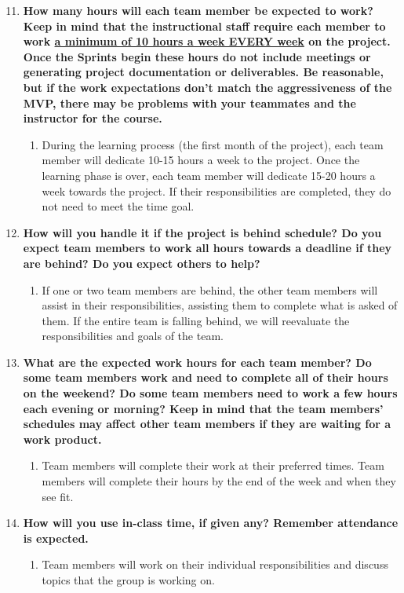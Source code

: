 \documentclass[12pt]{article}
\begin{document}
\begin{enumerate}
    \setcounter{enumi}{10}
    \item \textbf{How many hours will each team member be expected to work? Keep in mind that the instructional staff require each member to work \underline{a minimum of 10 hours a week EVERY week} on the project. Once the Sprints begin these hours do not include meetings or generating project documentation or deliverables. Be reasonable, but if the work expectations don't match the aggressiveness of the MVP, there may be problems with your teammates and the instructor for the course.}
    \begin{enumerate}
        \item During the learning process (the first month of the project), each team member will dedicate 10-15 hours a week to the project. Once the learning phase is over, each team member will dedicate 15-20 hours a week towards the project. If their responsibilities are completed, they do not need to meet the time goal.
    \end{enumerate}

    \item \textbf{How will you handle it if the project is behind schedule? Do you expect team members to work all hours towards a deadline if they are behind? Do you expect others to help?}
    \begin{enumerate}
        \item If one or two team members are behind, the other team members will assist in their responsibilities, assisting them to complete what is asked of them. If the entire team is falling behind, we will reevaluate the responsibilities and goals of the team.
    \end{enumerate}

    \item \textbf{What are the expected work hours for each team member? Do some team members work and need to complete all of their hours on the weekend? Do some team members need to work a few hours each evening or morning? Keep in mind that the team members' schedules may affect other team members if they are waiting for a work product.}
    \begin{enumerate}
        \item Team members will complete their work at their preferred times. Team members will complete their hours by the end of the week and when they see fit.
    \end{enumerate}

    \item \textbf{How will you use in-class time, if given any? Remember attendance is expected.}
    \begin{enumerate}
        \item Team members will work on their individual responsibilities and discuss topics that the group is working on.
    \end{enumerate}


\end{enumerate}
\end{document}
